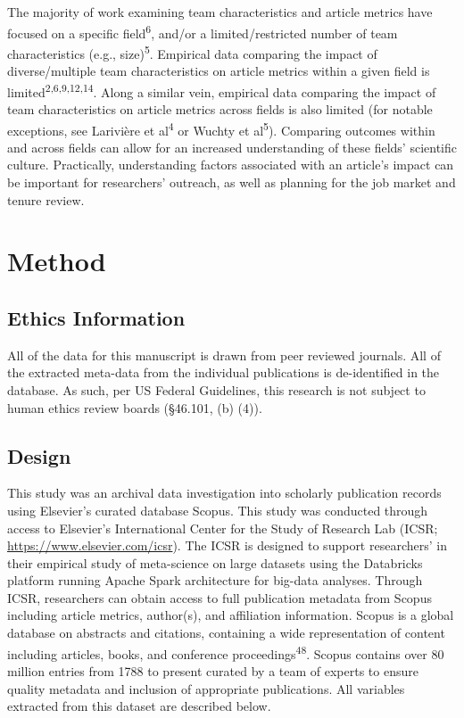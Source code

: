\documentclass[
  man,floatsintext]{apa6}
\begin{document}
The majority of work examining team characteristics and article metrics have focused on a specific field\textsuperscript{6}, and/or a limited/restricted number of team characteristics (e.g., size)\textsuperscript{5}. Empirical data comparing the impact of diverse/multiple team characteristics on article metrics within a given field is limited\textsuperscript{2,6,9,12,14}. Along a similar vein, empirical data comparing the impact of team characteristics on article metrics across fields is also limited (for notable exceptions, see Larivière et al\textsuperscript{4} or Wuchty et al\textsuperscript{5}). Comparing outcomes within and across fields can allow for an increased understanding of these fields' scientific culture. Practically, understanding factors associated with an article's impact can be important for researchers' outreach, as well as planning for the job market and tenure review.

\hypertarget{method}{%
\section{Method}\label{method}}

\hypertarget{ethics-information}{%
\subsection{Ethics Information}\label{ethics-information}}

All of the data for this manuscript is drawn from peer reviewed journals. All of the extracted meta-data from the individual publications is de-identified in the database. As such, per US Federal Guidelines, this research is not subject to human ethics review boards (§46.101, (b) (4)).

\hypertarget{design}{%
\subsection{Design}\label{design}}

This study was an archival data investigation into scholarly publication records using Elsevier's curated database Scopus. This study was conducted through access to Elsevier's International Center for the Study of Research Lab (ICSR; \url{https://www.elsevier.com/icsr}). The ICSR is designed to support researchers' in their empirical study of meta-science on large datasets using the Databricks platform running Apache Spark architecture for big-data analyses. Through ICSR, researchers can obtain access to full publication metadata from Scopus including article metrics, author(s), and affiliation information. Scopus is a global database on abstracts and citations, containing a wide representation of content including articles, books, and conference proceedings\textsuperscript{48}. Scopus contains over 80 million entries from 1788 to present curated by a team of experts to ensure quality metadata and inclusion of appropriate publications. All variables extracted from this dataset are described below.
\end{document}
